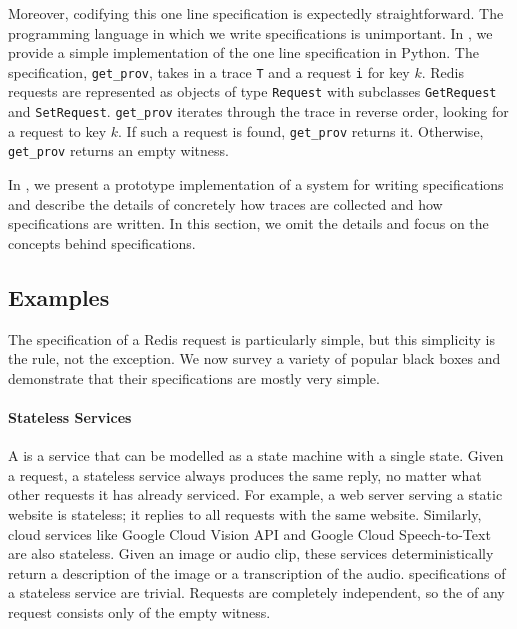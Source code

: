Moreover, codifying this one line \watprovenance{} specification is expectedly
straightforward. The programming language in which we write \watprovenance{}
specifications is unimportant. In , we provide a simple
implementation of the one line \watprovenance{} specification in Python. The
specification, \texttt{get\_prov}, takes in a trace \texttt{T} and a \kvget{}
request \texttt{i} for key $k$. Redis requests are represented as objects of
type \texttt{Request} with subclasses \texttt{GetRequest} and
\texttt{SetRequest}.  \texttt{get\_prov} iterates through the trace in reverse
order, looking for a \kvset{} request to key $k$. If such a \kvset{} request is
found, \texttt{get\_prov} returns it. Otherwise, \texttt{get\_prov} returns an
empty witness.

{}

In , we present a prototype
implementation of a system for writing \watprovenance{} specifications and
describe the details of concretely how traces are collected and how
\watprovenance{} specifications are written. In this section, we omit the
details and focus on the concepts behind \watprovenance{} specifications.

\subsection{Examples}
The \watprovenance{} specification of a Redis \kvget{} request is particularly
simple, but this simplicity is the rule, not the exception. We now survey a
variety of popular black boxes and demonstrate that their \watprovenance{}
specifications are mostly very simple.

\paragraph{Stateless Services}
A  is a service that can be modelled as a state
machine with a single state. Given a request, a stateless service always
produces the same reply, no matter what other requests it has already serviced.
For example, a web server serving a static website is stateless; it replies to
all requests with the same website. Similarly, cloud services like Google Cloud
Vision API and Google Cloud Speech-to-Text are also stateless. Given an image
or audio clip, these services deterministically return a description of the
image or a transcription of the audio. \Watprovenance{} specifications of a
stateless service are trivial. Requests are completely independent, so the
\watprovenance{} of any request consists only of the empty witness.


